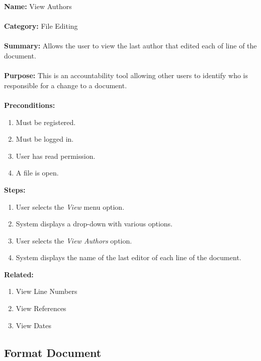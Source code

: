\documentclass[14pt, a4paper]{article}
\begin{document}
\begin{framed}
	\noindent\textbf{Name:} View Authors \\ \\
	\textbf{Category:} File Editing \\ \\
	\textbf{Summary:} Allows the user to view the last author that edited each of line of the document. \\ \\
	\textbf{Purpose:} This is an accountability tool allowing other users to identify who is responsible for a change to a document. \\ \\
	\textbf{Preconditions:} 
	\begin{enumerate}
		\item Must be registered.
		\item Must be logged in.
		\item User has read permission.
		\item A file is open.
	\end{enumerate}
	\textbf{Steps:}
	\begin{enumerate}
		\item User selects the \textit{View} menu option.
		\item System displays a drop-down with various options.
		\item User selects the \textit{View Authors} option.
		\item System displays the name of the last editor of each line of the document.
	\end{enumerate}
	\textbf{Related:}
	\begin{enumerate}
		\item View Line Numbers
		\item View References
		\item View Dates
	\end{enumerate}
\end{framed}

\newpage

\subsection{Format Document}
\end{document}
